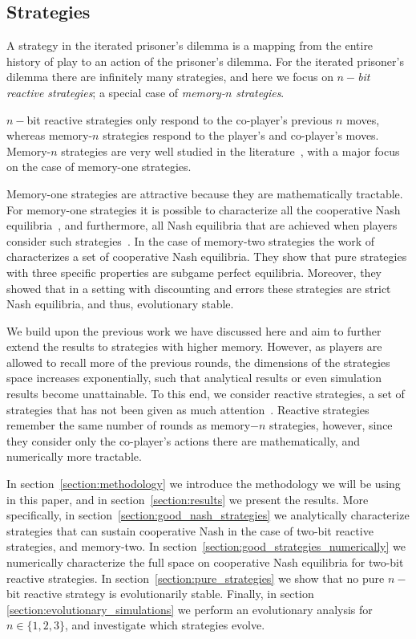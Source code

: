 \documentclass{article}
\theoremstyle{definition}
\begin{document}
\subsection{Strategies}

A strategy in the iterated prisoner's dilemma is a mapping from the entire history of
play to an action of the prisoner's dilemma. For the iterated prisoner's dilemma
there are infinitely many strategies, and here we focus on \textit{\(n-\)bit
reactive strategies}; a special case of \textit{memory-\(n\) strategies}.

\(n-\)bit reactive strategies only respond to the co-player's previous \(n\)
moves, whereas memory-\(n\) strategies respond to the player's and co-player's
moves. Memory-\(n\) strategies are very well studied in the
literature~\citep{baek:scientific:2016, hilbe:PNAS:2017,
glynatsi:scientific:2020, press:PNAS:2012, stewart:scientific:2016}, with a major
focus on the case of memory-one strategies.

Memory-one strategies are attractive because they are mathematically tractable.
For memory-one strategies it is possible to characterize all the cooperative
Nash equilibria~\citep{akin:EGADS:2016}, and furthermore, all Nash equilibria
that are achieved when players consider such
strategies~\citep{stewart:scientific:2016}. In the case of memory-two strategies
the work of~\citep{hilbe:PNAS:2017} characterizes a set of cooperative Nash equilibria.
They show that pure strategies with three specific properties are
subgame perfect equilibria. Moreover, they showed that in a setting with discounting
and errors these strategies are strict Nash equilibria, and thus, evolutionary stable.

We build upon the previous work we have discussed here and aim to further extend
the results to strategies with higher memory. However, as players are allowed to
recall more of the previous rounds, the dimensions of the strategies space
increases exponentially, such that analytical results or even simulation results
become unattainable. To this end, we consider reactive strategies,
a set of strategies that has not been given as much attention~\citep{baek:scientific:2016, sigmund:JTB:1989, wahl:JTB:1999}.
Reactive strategies remember
the same number of rounds as memory\(-n\) strategies, however, since they consider
only the co-player's actions there are mathematically, and numerically more
tractable.

In section~\ref{section:methodology} we introduce the methodology we will be
using in this paper, and in section~\ref{section:results} we present the
results. More specifically, in section~\ref{section:good_nash_strategies} we
analytically characterize strategies that can sustain cooperative Nash in the
case of two-bit reactive strategies, and memory-two. In
section~\ref{section:good_strategies_numerically} we numerically characterize
the full space on cooperative Nash equilibria for two-bit reactive strategies.
In section~\ref{section:pure_strategies} we show that no pure \(n-\)bit reactive
strategy is evolutionarily stable. Finally, in section
\ref{section:evolutionary_simulations} we perform an evolutionary analysis for
\(n \in \{1, 2, 3\}\), and investigate which strategies evolve.
\end{document}

